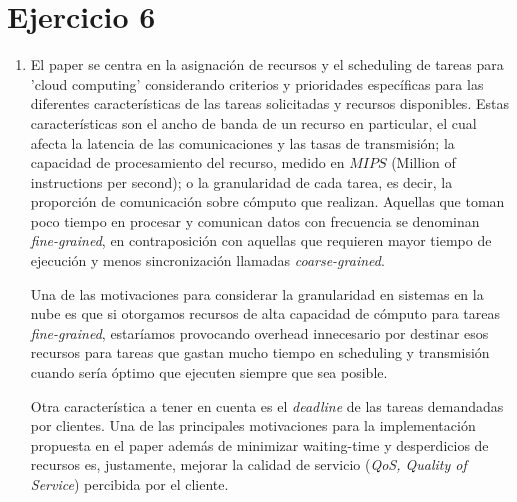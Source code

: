 \section{Ejercicio 6}

\begin{enumerate}[label=\alph*)]

    \item






	El paper se centra en la asignación de recursos y el scheduling de tareas para 'cloud computing' considerando criterios y prioridades específicas para las diferentes características de las tareas solicitadas y recursos disponibles. Estas características son el ancho de banda de un recurso en particular, el cual afecta la latencia de las comunicaciones y las tasas de transmisión;
la capacidad de procesamiento del recurso, medido en $MIPS$ (Million of instructions per second); o la granularidad de cada tarea, es decir, la proporción de comunicación sobre cómputo que realizan. Aquellas que toman poco tiempo en procesar y comunican datos con frecuencia se denominan \emph{fine-grained}, en contraposición con aquellas que requieren mayor tiempo de ejecución y menos sincronización llamadas \emph{coarse-grained}. 

	Una de las motivaciones para considerar la granularidad en sistemas en la nube es que si otorgamos recursos de alta capacidad de cómputo para tareas \emph{fine-grained}, estaríamos provocando overhead innecesario por destinar esos recursos para tareas que gastan mucho tiempo en scheduling y transmisión cuando sería óptimo que ejecuten siempre que sea posible.
	
	Otra característica a tener en cuenta es el \emph{deadline} de las tareas demandadas por clientes. Una de las principales motivaciones para la implementación propuesta en el paper además de minimizar waiting-time y desperdicios de recursos es, justamente, mejorar la calidad de servicio (\emph{QoS, Quality of Service}) percibida por el cliente.


\end{enumerate}
